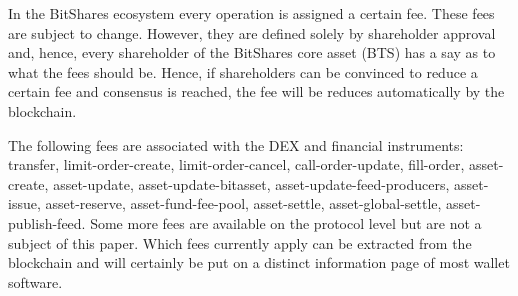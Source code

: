 \label{sec:dexfee}
\newcommand*\justify{%
  \fontdimen2\font=0.4em%
  \fontdimen3\font=0.2em%
  \fontdimen4\font=0.1em%
  \fontdimen7\font=0.1em%
  \hyphenchar\font=`\-%
}

In the BitShares ecosystem every operation is assigned a certain fee. These
fees are subject to change. However, they are defined solely by shareholder
approval and, hence, every shareholder of the BitShares core asset (BTS) has a
say as to what the fees should be. Hence, if shareholders can be convinced to
reduce a certain fee and consensus is reached, the fee will be reduces
automatically by the blockchain.

The following fees are associated with the DEX and financial instruments:
%
 transfer,
 limit-order-create,
 limit-order-cancel,
 call-order-update,
 fill-order,
 asset-create,
 asset-update,
 asset-update-bitasset,
 asset-update-feed-producers,
 asset-issue,
 asset-reserve,
 asset-fund-fee-pool,
 asset-settle,
 asset-global-settle,
 asset-publish-feed.
%
Some more fees are available on the protocol level but are not a subject of
this paper. Which fees currently apply can be extracted from the blockchain and
will certainly be put on a distinct information page of most wallet software.

